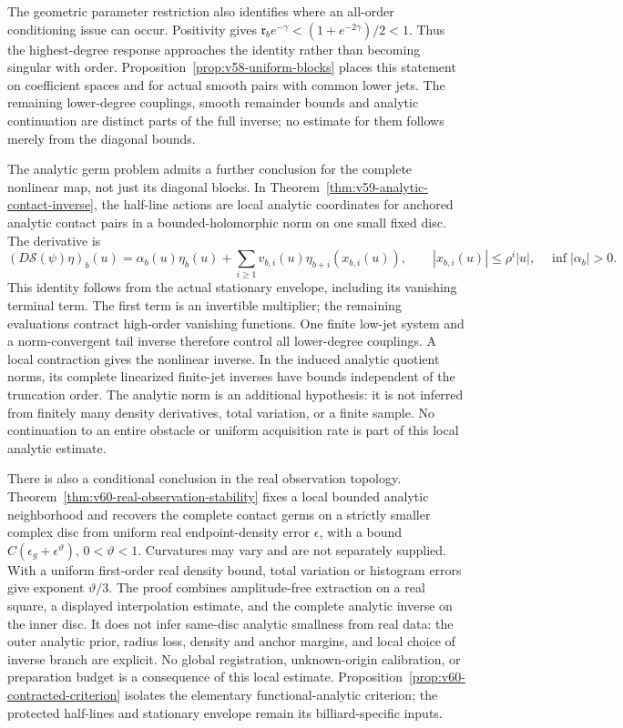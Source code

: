 The geometric parameter restriction also identifies where an
all-order conditioning issue can occur.  Positivity gives
$\mathfrak r_b e^{-\gamma}<(1+e^{-2\gamma})/2<1$.
Thus the highest-degree response approaches the identity rather than
becoming singular with order.  Proposition~\ref{prop:v58-uniform-blocks}
places this statement on coefficient spaces and for actual smooth
pairs with common lower jets.  The remaining lower-degree couplings,
smooth remainder bounds and analytic continuation are distinct parts
of the full inverse; no estimate for them follows merely from the
diagonal bounds.

The analytic germ problem admits a further conclusion for the complete
nonlinear map, not just its diagonal blocks.  In
Theorem~\ref{thm:v59-analytic-contact-inverse}, the half-line actions
are local analytic coordinates for anchored analytic contact pairs in a
bounded-holomorphic norm on one small fixed disc.  The derivative is
\[
 (D\mathscr S(\psi)\eta)_b(u)
 =\alpha_b(u)\eta_b(u)+
       \sum_{i\ge1}v_{b,i}(u)\eta_{b+i}(x_{b,i}(u)),
       \qquad |x_{b,i}(u)|\le\rho^i|u|,\quad \inf|\alpha_b|>0.
\]
This identity follows from the actual stationary envelope, including its
vanishing terminal term.  The first term is an invertible multiplier;
the remaining evaluations contract high-order vanishing functions.
One finite low-jet system and a norm-convergent tail inverse therefore
control all lower-degree couplings.  A local contraction gives the
nonlinear inverse.  In the induced analytic quotient norms, its complete
linearized finite-jet inverses have bounds independent of the truncation
order.  The analytic norm is an additional hypothesis: it is not inferred
from finitely many density derivatives, total variation, or a finite
sample.  No continuation to an entire obstacle or uniform acquisition
rate is part of this local analytic estimate.

There is also a conditional conclusion in the real observation topology.
Theorem~\ref{thm:v60-real-observation-stability} fixes a local bounded
analytic neighborhood and recovers the complete contact germs on a
strictly smaller complex disc from uniform real endpoint-density error
$\epsilon$, with a bound $C(\epsilon_g+\epsilon^\vartheta)$,
$0<\vartheta<1$.  Curvatures may vary and are not separately supplied.
With a uniform first-order real density bound, total variation or
histogram errors give exponent $\vartheta/3$.  The proof combines
amplitude-free extraction on a real square, a displayed interpolation
estimate, and the complete analytic inverse on the inner disc.
It does not infer same-disc analytic smallness from real data: the
outer analytic prior, radius loss, density and anchor margins, and
local choice of inverse branch are explicit.  No global registration,
unknown-origin calibration, or preparation budget is a consequence of
this local estimate.  Proposition~\ref{prop:v60-contracted-criterion}
isolates the elementary functional-analytic criterion; the protected
half-lines and stationary envelope remain its billiard-specific inputs.


